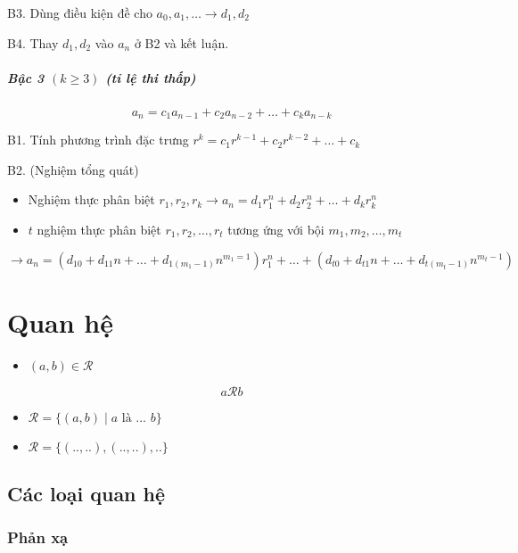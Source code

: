 \documentclass[11pt]{article}
\providecommand{\tightlist}{%
      \setlength{\itemsep}{0pt}\setlength{\parskip}{0pt}}
\begin{document}
B3. Dùng điều kiện đề cho \(a_0, a_1, \ldots \to d_1, d_2\)

B4. Thay \(d_1, d_2\) vào \(a_n\) ở B2 và kết luận.

    \subparagraph{\texorpdfstring{Bậc 3 \((k \geq 3)\) (tỉ lệ thi
thấp)}{Bậc 3 (k \textbackslash geq 3) (tỉ lệ thi thấp)}}\label{bux1eadc-3-k-geq-3-tux1ec9-lux1ec7-thi-thux1ea5p}

    \[
a_n = c_1 a_{n-1} + c_2 a_{n-2} + \ldots + c_k a_{n-k}
\]

    B1. Tính phương trình đặc trưng
\(r^k = c_1 r^{k-1} + c_2 r^{k-2} + \ldots + c_k\)

B2. (Nghiệm tổng quát)

\begin{itemize}
\item
  Nghiệm thực phân biệt
  \(r_1, r_2, r_k \to a_n = d_1r_1^n + d_2 r_2^n + \ldots + d_kr_k^n\)
\item
  \(t\) nghiệm thực phân biệt \(r_1, r_2, \ldots , r_t\) tương ứng với
  bội \(m_1, m_2, \ldots , m_t\)
\end{itemize}

\[\to a_n = (d_{10} + d_{11}n + \ldots + d_{1(m_1 -1)}n^{m_1 =1})r_1^n + \ldots + (d_{t0} + d_{t1}n + \ldots + d_{t(m_t -1)}n^{m_t -1})\]

    \section{Quan hệ}\label{quan-hux1ec7}

    \begin{itemize}
\tightlist
\item
  \((a,b) \in \mathcal{R}\)
\end{itemize}

\[
a\mathcal{R} b
\]

\begin{itemize}
\item
  \(\mathcal{R} = \{ (a,b) \mid a \text{ là ... } b \}\)
\item
  \(\mathcal{R} = \{ (.., ..),(.. , ..), .. \}\)
\end{itemize}

    \subsection{Các loại quan hệ}\label{cuxe1c-loux1ea1i-quan-hux1ec7}

    \subsubsection{Phản xạ}\label{phux1ea3n-xux1ea1}
\end{document}

